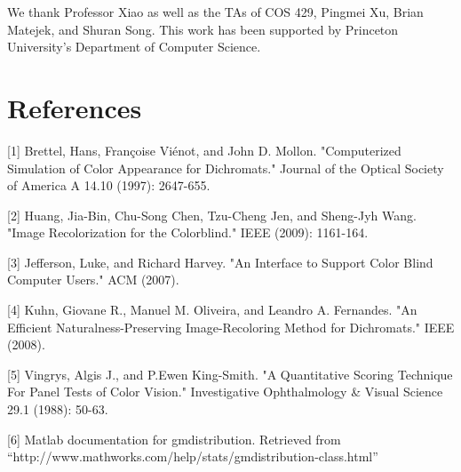 \documentclass[10pt,twocolumn,letterpaper]{article}
\begin{document}
We thank Professor Xiao as well as the TAs of COS 429, Pingmei Xu, Brian Matejek, and Shuran Song. This work has been supported by Princeton University’s Department of Computer Science. 


\section{References}

{\small


[1] Brettel, Hans, Françoise Viénot, and John D. Mollon. "Computerized Simulation of Color 
Appearance for Dichromats." Journal of the Optical Society of America A 14.10 (1997): 2647-655. 

[2] Huang, Jia-Bin, Chu-Song Chen, Tzu-Cheng Jen, and Sheng-Jyh Wang. "Image Recolorization for the Colorblind." IEEE (2009): 1161-164. 

[3] Jefferson, Luke, and Richard Harvey. "An Interface to Support Color Blind Computer Users." ACM (2007).

[4] Kuhn, Giovane R., Manuel M. Oliveira, and Leandro A. Fernandes. "An Efficient Naturalness-Preserving Image-Recoloring Method for Dichromats." IEEE (2008).

[5] Vingrys, Algis J., and P.Ewen King-Smith. "A Quantitative Scoring Technique For Panel Tests of Color Vision." Investigative Ophthalmology \& Visual Science 29.1 (1988): 50-63. 

[6] Matlab documentation for gmdistribution. Retrieved from ``http://www.mathworks.com/help/stats/gmdistribution-class.html''

}
\end{document}

